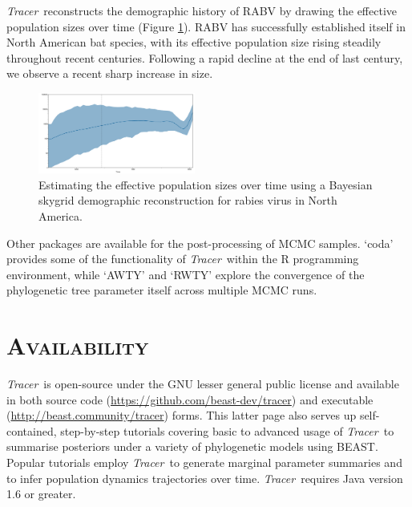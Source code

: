 \documentclass[webpdf,mynatbib,nosurname,nogrid,noCE,noMSC]{SYS}
\newcommand{\tracer}{\emph{Tracer}}
\begin{document}
\tracer\ reconstructs the demographic history of RABV by drawing the effective population sizes over time (Figure \ref{fig:rabv}).
RABV has successfully established itself in North American bat species, with its effective population size rising steadily throughout recent centuries.
Following a rapid decline at the end of last century, we observe a recent sharp increase in size.

\begin{figure}[t]
\centerline{
\includegraphics[width=0.46\textwidth]{../figures/rabv-skygrid.pdf}
}
\vspace{-0.25cm}
\caption{Estimating the effective population sizes over time using a Bayesian skygrid demographic reconstruction for rabies virus in North America.}
\label{fig:rabv}
\end{figure}



Other packages are available for the post-processing of MCMC samples. %
 `coda' \citep{plummer2006coda} provides some of the functionality of \tracer\ within the R programming environment, while `AWTY' \citep{nylander2007awty} and `RWTY' \citep{warren2017rwty} explore the convergence of the phylogenetic tree parameter itself across multiple MCMC runs.

\vspace{-0.55cm}

\section*{\textsc{Availability}}

\tracer\ is open-source under the GNU lesser general public license and available in both source code (\url{https://github.com/beast-dev/tracer}) and executable (\url{http://beast.community/tracer}) forms.
This latter page also serves up self-contained, step-by-step tutorials covering basic to advanced usage of \tracer\ to summarise posteriors under a variety of phylogenetic models using BEAST.
Popular tutorials employ \tracer\ to generate marginal parameter summaries and to infer population dynamics trajectories over time.
\tracer\ requires Java version 1.6 or greater.
\end{document}
